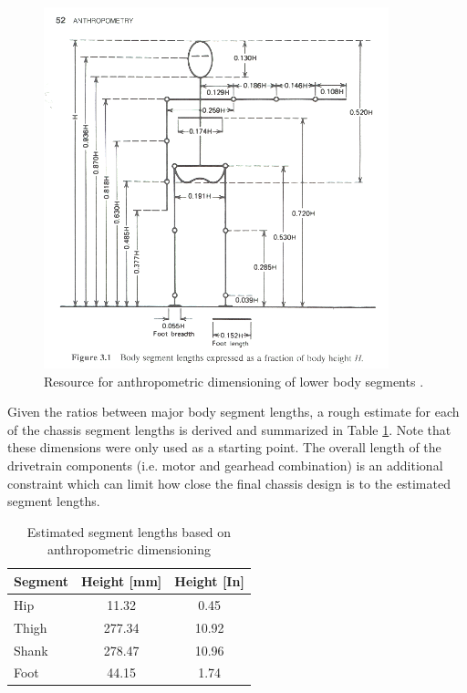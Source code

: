\begin{figure}[!h]
	\begin{center}
    \includegraphics[width=100mm]{fig/design/anthropo.png}
	\end{center}
  \caption{Resource for anthropometric dimensioning of lower body segments \cite{wintergait}.}
\label{fig:anthropo}
\end{figure}
	
Given the ratios between major body segment lengths, a rough estimate for each of the chassis segment lengths is derived and summarized in Table \ref{tab:anthropo}. Note that these dimensions were only used as a starting point. The overall length of the drivetrain components (i.e. motor and gearhead combination) is an additional constraint which can limit how close the final chassis design is to the estimated segment lengths.  

\begin{table}[!h]
  \centering
  \caption{Estimated segment lengths based on anthropometric dimensioning}
  \label{tab:anthropo}%
    \begin{tabular}{lcc}
    \addlinespace
    \toprule
    \textbf{Segment} & \textbf{Height [mm]} & \textbf{Height [In]} \\
    \midrule
    Hip   & 11.32 & 0.45 \\
    Thigh & 277.34 & 10.92 \\
    Shank & 278.47 & 10.96 \\
    Foot  & 44.15 & 1.74 \\
    \bottomrule
    \end{tabular}%
\end{table}

